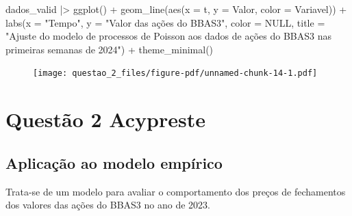 \documentclass[
  letterpaper,
  DIV=11,
  numbers=noendperiod]{scrreprt}
\newenvironment{Shaded}{\begin{snugshade}}{\end{snugshade}}
\newcommand{\AttributeTok}[1]{\textcolor[rgb]{0.40,0.45,0.13}{#1}}
\newcommand{\ConstantTok}[1]{\textcolor[rgb]{0.56,0.35,0.01}{#1}}
\newcommand{\FunctionTok}[1]{\textcolor[rgb]{0.28,0.35,0.67}{#1}}
\newcommand{\NormalTok}[1]{\textcolor[rgb]{0.00,0.23,0.31}{#1}}
\newcommand{\SpecialCharTok}[1]{\textcolor[rgb]{0.37,0.37,0.37}{#1}}
\newcommand{\StringTok}[1]{\textcolor[rgb]{0.13,0.47,0.30}{#1}}
\begin{document}
\begin{Shaded}
\begin{Highlighting}[]
\NormalTok{dados\_valid }\SpecialCharTok{|\textgreater{}}
    \FunctionTok{ggplot}\NormalTok{() }\SpecialCharTok{+}
    \FunctionTok{geom\_line}\NormalTok{(}\FunctionTok{aes}\NormalTok{(}\AttributeTok{x =}\NormalTok{ t, }\AttributeTok{y =}\NormalTok{ Valor, }\AttributeTok{color =}\NormalTok{ Variavel)) }\SpecialCharTok{+}
    \FunctionTok{labs}\NormalTok{(}\AttributeTok{x =} \StringTok{"Tempo"}\NormalTok{,}
         \AttributeTok{y =} \StringTok{"Valor das ações do BBAS3"}\NormalTok{,}
         \AttributeTok{color =} \ConstantTok{NULL}\NormalTok{,}
         \AttributeTok{title =} \StringTok{"Ajuste do modelo de processos de Poisson aos dados}
\StringTok{          de ações do BBAS3 nas primeiras semanas de 2024"}\NormalTok{) }\SpecialCharTok{+}
    \FunctionTok{theme\_minimal}\NormalTok{()}
\end{Highlighting}
\end{Shaded}

\begin{figure}[H]

{\centering \texttt{[image: questao\_2\_files/figure-pdf/unnamed-chunk-14-1.pdf]}

}

\end{figure}


\hypertarget{questuxe3o-2-acypreste}{%
\chapter*{Questão 2 Acypreste}\label{questuxe3o-2-acypreste}}


\hypertarget{aplicauxe7uxe3o-ao-modelo-empuxedrico-2}{%
\section*{Aplicação ao modelo
empírico}\label{aplicauxe7uxe3o-ao-modelo-empuxedrico-2}}


Trata-se de um modelo para avaliar o comportamento dos preços de
fechamentos dos valores das ações do BBAS3 no ano de 2023.
\end{document}
